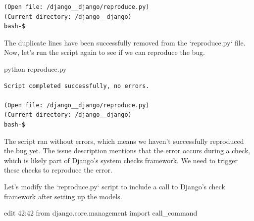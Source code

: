 {\begin{observationbox}
\begin{Verbatim}[breaklines=true, breakanywhere=true]
(Open file: /django__django/reproduce.py)
(Current directory: /django__django)
bash-$
\end{Verbatim}
\end{observationbox}
\begin{agentbox}
The duplicate lines have been successfully removed from the `reproduce.py` file. Now, let's run the script again to see if we can reproduce the bug.



\hrulefill
\begin{CodeVerbatim}[breaklines=true, breakanywhere=true]
python reproduce.py
\end{CodeVerbatim}
\end{agentbox}
\begin{observationbox}\begin{Verbatim}[breaklines=true, breakanywhere=true]
Script completed successfully, no errors.

(Open file: /django__django/reproduce.py)
(Current directory: /django__django)
bash-$
\end{Verbatim}
\end{observationbox}
\begin{agentbox}
The script ran without errors, which means we haven't successfully reproduced the bug yet. The issue description mentions that the error occurs during a check, which is likely part of Django's system checks framework. We need to trigger these checks to reproduce the error.



Let's modify the `reproduce.py` script to include a call to Django's check framework after setting up the models.



\hrulefill
\begin{CodeVerbatim}[breaklines=true, breakanywhere=true]
edit 42:42
from django.core.management import call_command


\end{CodeVerbatim}
\end{agentbox}}

